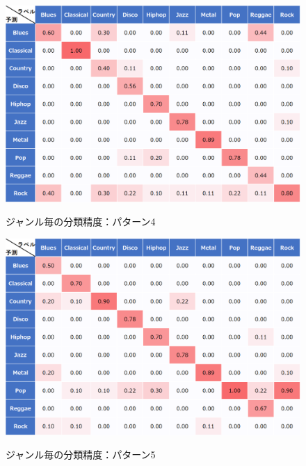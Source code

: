 \begin{figure}[htbp]
	\begin{center}
		\includegraphics[scale=0.5]{./images/classify-model/mel4_matrix.png}
		\caption{ジャンル毎の分類精度：パターン4}
		\label{fig:CNN4}
		\vspace{50pt}
		\includegraphics[scale=0.5]{./images/classify-model/mel5_matrix.png}
		\caption{ジャンル毎の分類精度：パターン5}
		\label{fig:CNN5}
	\end{center}
\end{figure}
\newpage
